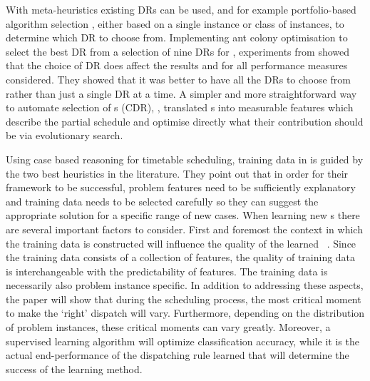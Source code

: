 \documentclass[twocolumn]{svjour3}
\begin{document}
With meta-heuristics existing DRs can be used, and for example 
portfolio-based algorithm selection \cite{Rice76,Gomes01,Xu07}, either based on 
a single instance or class of instances, to determine which DR to choose from. 
Implementing ant colony optimisation to select the best DR 
from a selection of nine DRs for \JSP, experiments from \cite{Korytkowski13} 
showed that the choice of DR does affect the results and for all performance 
measures considered. They showed that it was better to have all the DRs to 
choose from rather than just a single DR at a time.
%
A simpler and more straightforward way to automate selection of \cdr s (CDR), 
\cite{InRu14}, translated \dr s into measurable features which describe the 
partial schedule and optimise directly what their contribution should be via 
evolutionary search. 

Using case based reasoning for timetable scheduling, training data in 
\cite{Burke06} is guided by the two best heuristics in the literature.
They point out that in order for their framework to be successful, problem 
features need to be sufficiently explanatory and training data needs to be 
selected carefully so they can suggest the appropriate solution for a specific 
range of new cases. 
%
When learning new \dr s there are several important 
factors to consider. First and foremost the context in which the training data 
is constructed 
will influence the quality of the learned \dr\ \cite{Burke06}. 
Since the training data consists of a collection of features, the quality of 
training data is interchangeable with the predictability of features. 
The training data is necessarily also problem instance specific. %
In addition to addressing these aspects, the paper will show that during 
the scheduling process, the most critical moment to make the `right' dispatch 
will vary. Furthermore, depending on the distribution of problem 
instances, these critical moments can vary greatly. 
Moreover, a supervised learning algorithm will optimize classification 
accuracy, while it is the actual end-performance of the dispatching rule 
learned that will determine the success of the learning method. 
\end{document}
